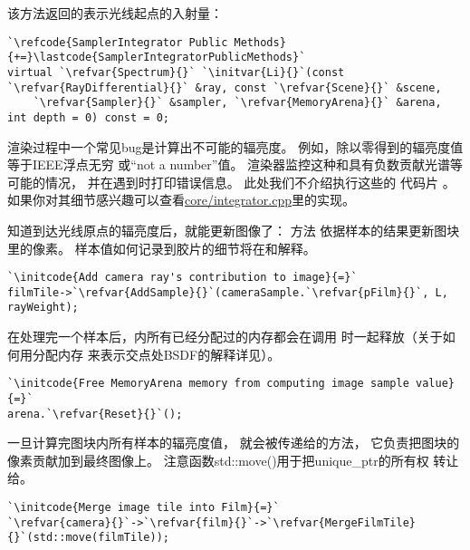该方法返回的表示光线起点的入射量：
\begin{lstlisting}
`\refcode{SamplerIntegrator Public Methods}{+=}\lastcode{SamplerIntegratorPublicMethods}`
virtual `\refvar{Spectrum}{}` `\initvar{Li}{}`(const `\refvar{RayDifferential}{}` &ray, const `\refvar{Scene}{}` &scene,
    `\refvar{Sampler}{}` &sampler, `\refvar{MemoryArena}{}` &arena, int depth = 0) const = 0;
\end{lstlisting}

渲染过程中一个常见bug是计算出不可能的辐亮度。
例如，除以零得到的辐亮度值等于IEEE浮点无穷
或“not a number”值。
渲染器监控这种和具有负数贡献光谱等可能的情况，
并在遇到时打印错误信息。
此处我们不介绍执行这些的
代码片
。
如果你对其细节感兴趣可以查看\href{https://github.com/mmp/pbrt-v3/tree/master/src/core/integrator.cpp}{\ttfamily core/integrator.cpp}里的实现。

知道到达光线原点的辐亮度后，就能更新图像了：
方法
依据样本的结果更新图块里的像素。
样本值如何记录到胶片的细节将在和解释。
\begin{lstlisting}
`\initcode{Add camera ray's contribution to image}{=}`
filmTile->`\refvar{AddSample}{}`(cameraSample.`\refvar{pFilm}{}`, L, rayWeight);
\end{lstlisting}

在处理完一个样本后，内所有已经分配过的内存都会在调用
时一起释放（关于如何用分配内存
来表示交点处BSDF的解释详见）。
\begin{lstlisting}
`\initcode{Free MemoryArena memory from computing image sample value}{=}`
arena.`\refvar{Reset}{}`();
\end{lstlisting}

一旦计算完图块内所有样本的辐亮度值，
就会被传递给的方法，
它负责把图块的像素贡献加到最终图像上。
注意函数{\ttfamily std::move()}用于把{\ttfamily unique\_ptr}的所有权
转让给。
\begin{lstlisting}
`\initcode{Merge image tile into Film}{=}`
`\refvar{camera}{}`->`\refvar{film}{}`->`\refvar{MergeFilmTile}{}`(std::move(filmTile));
\end{lstlisting}

